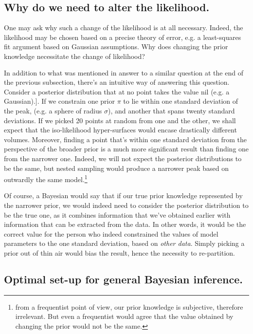 \documentclass[usenatbib]{mnras}
\begin{document}
\subsection{Why do we need to alter the likelihood.}
\label{sec:org8d6c38c}
One may ask why such a change of the likelihood is at all
necessary. Indeed, the likelihood may be chosen based on a precise
theory of error, e.g. a least-squares fit argument based on
Gaussian assumptions. Why does changing the prior knowledge
necessitate the change of likelihood?

In addition to what was mentioned in answer to a similar question
at the end of the previous subsection, there's an intuitive way of
answering this question. Consider a posterior distribution that at
no point takes the value nil (e.g. a Gaussian).]. If we constrain
one prior \(\pi\) to lie within one standard deviation of the
peak, (e.g. a sphere of radius \(\sigma\)), and another that spans
twenty standard deviations. If we picked 20 points at random from
one and the other, we shall expect that the iso-likelihood
hyper-surfaces would encase drastically different
volumes. Moreover, finding a point that's within one standard
deviation from the perspective of the broader prior is a much more
significant result than finding one from the narrower one. Indeed,
we will not expect the posterior distributions to be the same, but
nested sampling would produce a narrower peak based on outwardly
the same model.\footnote{from a frequentist point of view, our prior
knowledge is subjective, therefore irrelevant. But even a
frequentist would agree that the value obtained by changing the
prior would not be the same.}

Of course, a Bayesian would say that if our true prior knowledge
represented by the narrower prior, we would indeed need to consider
the posterior distribution to be the true one, as it combines
information that we've obtained earlier with information that can
be extracted from the data. In other words, it would be the correct
value for the person who indeed constrained the values of model
parameters to the one standard deviation, based on \emph{other
data}. Simply picking a prior out of thin air would bias the
result, hence the necessity to re-partition.

\subsection{Optimal set-up for general Bayesian inference.}
\label{sec:org4daa9f0}
\end{document}

